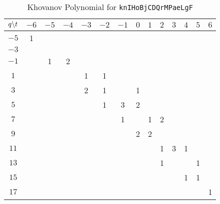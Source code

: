 \documentclass{article}
\theoremstyle{plain}
\begin{document}
        \begin{table}[H]
            \centering
            \begin{tabular}{| c | c | c | c | c | c | c | c | c | c | c | c | c | c |}
                \hline
                $q\symbol{92}t$&$-6$&$-5$&$-4$&$-3$&$-2$&$-1$&$0$&$1$&$2$&$3$&$4$&$5$&$6$\\
                \hline
                $-5$&1&&&&&&&&&&&&\\
                \hline
                $-3$&&&&&&&&&&&&&\\
                \hline
                $-1$&&1&2&&&&&&&&&&\\
                \hline
                $1$&&&&1&1&&&&&&&&\\
                \hline
                $3$&&&&2&1&&1&&&&&&\\
                \hline
                $5$&&&&&1&3&2&&&&&&\\
                \hline
                $7$&&&&&&1&&1&2&&&&\\
                \hline
                $9$&&&&&&&2&2&&&&&\\
                \hline
                $11$&&&&&&&&&1&3&1&&\\
                \hline
                $13$&&&&&&&&&1&&&1&\\
                \hline
                $15$&&&&&&&&&&&1&1&\\
                \hline
                $17$&&&&&&&&&&&&&1\\
                \hline
            \end{tabular}
            \caption{Khovanov Polynomial for \texttt{knIHoBjCDQrMPaeLgF}}
            \label{table:knIHoBjCDQrMPaeLgF_kho}
        \end{table}
\end{document}
